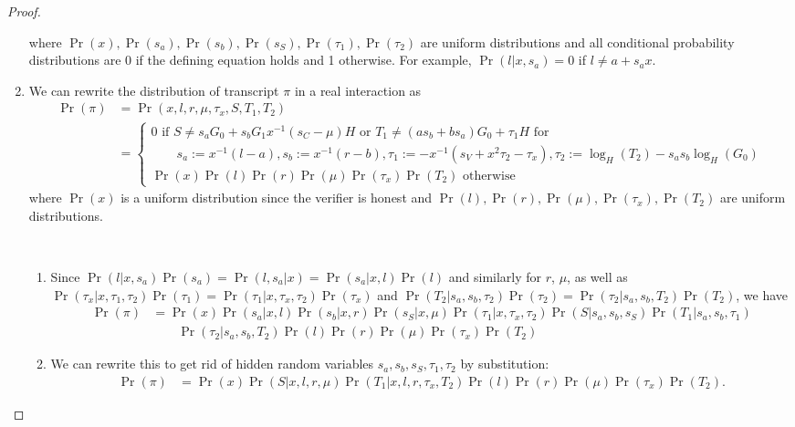 \begin{proof}
\begin{enumerate}
    where $\Pr(x),\Pr(s_a),\Pr(s_b),\Pr(s_S),\Pr(\tau_1),\Pr(\tau_2)$ are uniform distributions and all conditional probability distributions are 0 if the defining equation holds and 1 otherwise. For example, $\Pr(l|x, s_a) = 0$ if $l\ne a + s_ax$.
   \item We can rewrite the distribution of transcript $\pi$ in a real interaction as
    \begin{align*}
        \Pr(\pi) &= \Pr(x, l, r, \mu, \tau_x, S, T_1, T_2)\\
                        &= \begin{cases} 0 \text{ if } S \ne s_aG_0 + s_bG_1 x^{-1}(s_C - \mu)H \text{ or } T_1 \ne (as_b + bs_a)G_0 + \tau_1H \text{ for }\\ \qquad s_a := x^{-1}(l - a), s_b := x^{-1}(r - b), \tau_1 := - x^{-1}(s_V  + x^2\tau_2 - \tau_x), \tau_2 := \log_H(T_2) - s_as_b\log_H(G_0) \\
                             \Pr(x)\Pr(l)\Pr(r)\Pr(\mu)\Pr(\tau_x)\Pr(T_2) \text{ otherwise}
                             \end{cases}
    \end{align*}
    where $\Pr(x)$ is a uniform distribution since the verifier is honest and $\Pr(l),\Pr(r),\Pr(\mu),\Pr(\tau_x),\Pr(T_2)$ are uniform distributions.
   \begin{innerproof}
     $ $\par
     \begin{enumerate}
     \item Since $\Pr(l|x, s_a)\Pr(s_a) = \Pr(l,s_a|x) = \Pr(s_a|x, l) \Pr(l)$ and similarly for $r$, $\mu$, as well as $\Pr(\tau_x| x, \tau_1, \tau_2)\Pr(\tau_1 ) = \Pr(\tau_1| x, \tau_x, \tau_2)\Pr(\tau_x )$ and $\Pr(T_2| s_a, s_b, \tau_2)\Pr(\tau_2) = \Pr(\tau_2| s_a, s_b, T_2)\Pr(T_2)$,
       we have
       \begin{align*}
      \Pr(\pi) &= \Pr(x) \Pr(s_a|x, l) \Pr(s_b|x, r) \Pr(s_S| x, \mu) \Pr(\tau_1| x, \tau_x, \tau_2) \Pr(S| s_a, s_b, s_S) \Pr(T_1| s_a, s_b, \tau_1)\\
      &\qquad \Pr(\tau_2| s_a, s_b, T_2) \Pr(l)\Pr(r)\Pr(\mu)\Pr(\tau_x )\Pr(T_2)
       \end{align*}
     \item We can rewrite this to get rid of hidden random variables $s_a, s_b, s_S, \tau_1, \tau_2$ by substitution:
       \begin{align*}
      \Pr(\pi) &= \Pr(x) \Pr(S| x, l, r, \mu) \Pr(T_1| x, l, r, \tau_x, T_2) \Pr(l)\Pr(r)\Pr(\mu)\Pr(\tau_x )\Pr(T_2).
       \end{align*}

\end{enumerate}
\end{innerproof}
\end{enumerate}
\end{proof}
